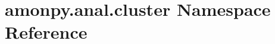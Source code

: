 \hypertarget{namespaceamonpy_1_1anal_1_1cluster}{\section{amonpy.\-anal.\-cluster Namespace Reference}
\label{namespaceamonpy_1_1anal_1_1cluster}
}
